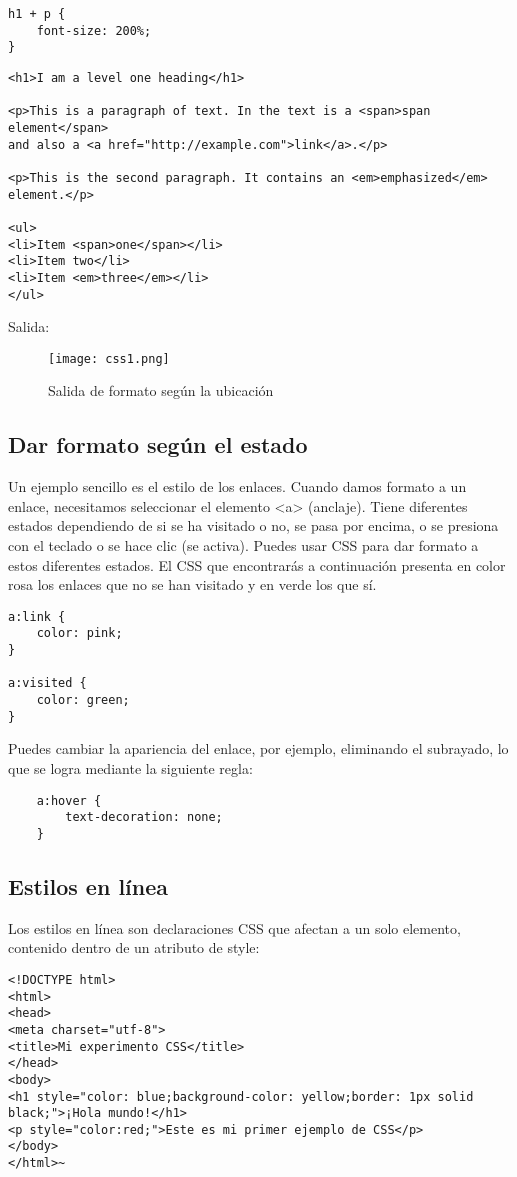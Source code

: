 \begin{enumerate}
\begin{lstlisting}
h1 + p {
	font-size: 200%;
}
\end{lstlisting}

\begin{lstlisting}
<h1>I am a level one heading</h1>

<p>This is a paragraph of text. In the text is a <span>span element</span> 
and also a <a href="http://example.com">link</a>.</p>

<p>This is the second paragraph. It contains an <em>emphasized</em> element.</p>

<ul>
<li>Item <span>one</span></li>
<li>Item two</li>
<li>Item <em>three</em></li>
</ul>
\end{lstlisting}

Salida:

\begin{figure}[H]
	\center
	\texttt{[image: css1.png]}
	\caption{Salida de formato según la ubicación}
	\label{fig:super}
\end{figure}

\subsection{Dar formato según el estado}

 Un ejemplo sencillo es el estilo de los enlaces. Cuando damos formato a un enlace, necesitamos seleccionar el elemento <a> (anclaje). Tiene diferentes estados dependiendo de si se ha visitado o no, se pasa por encima, o se presiona con el teclado o se hace clic (se activa). Puedes usar CSS para dar formato a estos diferentes estados. El CSS que encontrarás a continuación presenta en color rosa los enlaces que no se han visitado y en verde los que sí.
 
 \begin{lstlisting}
a:link {
	color: pink;
}

a:visited {
	color: green;
}
 \end{lstlisting}

Puedes cambiar la apariencia del enlace, por ejemplo, eliminando el subrayado, lo que se logra mediante la siguiente regla:

 \begin{lstlisting}
	a:hover {
		text-decoration: none;
	}
\end{lstlisting}

\subsection{Estilos en línea}
Los estilos en línea son declaraciones CSS que afectan a un solo elemento, contenido dentro de un atributo de style:
\begin{lstlisting}
<!DOCTYPE html>
<html>
<head>
<meta charset="utf-8">
<title>Mi experimento CSS</title>
</head>
<body>
<h1 style="color: blue;background-color: yellow;border: 1px solid black;">¡Hola mundo!</h1>
<p style="color:red;">Este es mi primer ejemplo de CSS</p>
</body>
</html>~
\end{lstlisting}


\end{enumerate}
